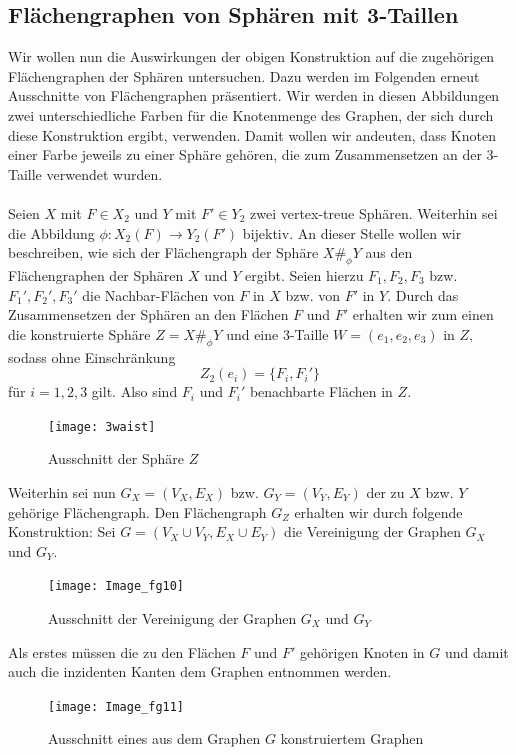 \documentclass[12pt,titlepage,twoside,cleardoublepage]{article}
\theoremstyle{nummermitklammern}
\numberwithin{equation}{section}
\begin{document}
\subsection{Flächengraphen von Sphären mit 3-Taillen}
Wir wollen nun die Auswirkungen der obigen Konstruktion auf die zugehörigen Flächengraphen der Sphären untersuchen.
Dazu werden im Folgenden erneut Ausschnitte von Flächengraphen präsentiert. Wir werden in diesen Abbildungen zwei unterschiedliche Farben für die Knotenmenge des Graphen, der sich durch diese Konstruktion ergibt, verwenden. Damit wollen wir andeuten, dass Knoten einer Farbe jeweils zu einer Sphäre gehören, die zum Zusammensetzen an der 3-Taille verwendet wurden.\\\\
Seien $X$ mit $F\in X_2$ und $Y$ mit $F'\in Y_2$ zwei vertex-treue Sphären. Weiterhin sei die Abbildung $\phi:X_2(F)\to Y_2(F')$ bijektiv. An dieser Stelle wollen wir beschreiben, wie sich der Flächengraph der Sphäre $X\#_{\phi}Y$ aus den Flächengraphen der Sphären $X$ und $Y$ ergibt. Seien hierzu $F_1,F_2,F_3$ bzw. $F_1',F_2',F_3'$ die Nachbar-Flächen von $F$ in $X$ bzw. von $F'$ in $Y.$ Durch das Zusammensetzen der Sphären an den Flächen $F$ und $F'$ erhalten wir zum einen die konstruierte Sphäre $Z=X \#_\phi Y$ und eine 3-Taille $W=(e_1,e_2,e_3)$ in $Z,$ sodass ohne Einschränkung 
\[
Z_2(e_i)=\{F_i,F_i'\}
\] für $i=1,2,3$ gilt. Also sind $F_i$ und $F_i'$ benachbarte Flächen in $Z$.
\begin{figure}[H]
\begin{center}
\texttt{[image: 3waist]}
\end{center}
\caption{Ausschnitt der Sphäre $Z$}
\end{figure}   
 Weiterhin sei nun $G_X=(V_X,E_X)$ bzw. $G_Y=(V_Y,E_Y)$ der zu $X$ bzw. $Y$ gehörige Flächengraph. Den Flächengraph $G_Z$ erhalten wir durch folgende Konstruktion:
Sei $G=(V_X\cup V_Y,E_X \cup E_Y)$ die Vereinigung der Graphen $G_X$ und $G_Y.$
\begin{figure}[H]
\begin{center}
\texttt{[image: Image\_fg10]}
\end{center}
\caption{Ausschnitt der Vereinigung der Graphen $G_X$ und $G_Y$}
\end{figure}
Als erstes müssen die zu den Flächen $F$ und $F'$ gehörigen Knoten in $G$ und damit auch die inzidenten Kanten dem Graphen entnommen werden. 
\begin{figure}[H]
\begin{center}
\texttt{[image: Image\_fg11]}
\end{center}
\caption{Ausschnitt eines aus dem Graphen $G$ konstruiertem Graphen}
\end{figure}
\end{document}
